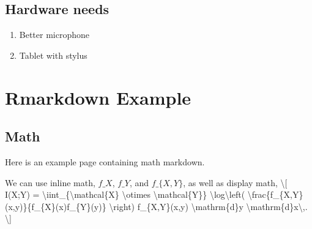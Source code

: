 \documentclass[
]{book}
\newenvironment{Shaded}{\begin{snugshade}}{\end{snugshade}}
\newcommand{\NormalTok}[1]{#1}
\newcommand{\SpecialCharTok}[1]{\textcolor[rgb]{0.00,0.00,0.00}{#1}}
\newcommand{\SpecialStringTok}[1]{\textcolor[rgb]{0.31,0.60,0.02}{#1}}
\providecommand{\tightlist}{%
  \setlength{\itemsep}{0pt}\setlength{\parskip}{0pt}}
\begin{document}
\hypertarget{hardware-needs}{%
\section*{Hardware needs}\label{hardware-needs}}

\begin{enumerate}
\def\labelenumi{\arabic{enumi}.}
\tightlist
\item
  Better microphone
\item
  Tablet with stylus
\end{enumerate}

\hypertarget{rmarkdown-example}{%
\chapter*{Rmarkdown Example}\label{rmarkdown-example}}

\hypertarget{math}{%
\section*{Math}\label{math}}

Here is an example page containing math markdown.

\begin{Shaded}
\begin{Highlighting}[]
\NormalTok{We can use inline math, }\SpecialStringTok{$f\_X$}\NormalTok{, }\SpecialStringTok{$f\_Y$}\NormalTok{, and }\SpecialStringTok{$f\_\{X,Y\}$}\NormalTok{, as well as display math, }
\SpecialStringTok{\textbackslash{}[}
\SpecialStringTok{  I(X;Y)}
\SpecialStringTok{  = }\SpecialCharTok{\textbackslash{}iint}\SpecialStringTok{\_\{}\SpecialCharTok{\textbackslash{}mathcal}\SpecialStringTok{\{X\} }\SpecialCharTok{\textbackslash{}otimes}\SpecialStringTok{ }\SpecialCharTok{\textbackslash{}mathcal}\SpecialStringTok{\{Y\}\}}
\SpecialStringTok{  }\SpecialCharTok{\textbackslash{}log\textbackslash{}left}\SpecialStringTok{( }\SpecialCharTok{\textbackslash{}frac}\SpecialStringTok{\{f\_\{X,Y\}(x,y)\}\{f\_\{X\}(x)f\_\{Y\}(y)\} }\SpecialCharTok{\textbackslash{}right}\SpecialStringTok{)}
\SpecialStringTok{  f\_\{X,Y\}(x,y) }\SpecialCharTok{\textbackslash{}mathrm}\SpecialStringTok{\{d\}y }\SpecialCharTok{\textbackslash{}mathrm}\SpecialStringTok{\{d\}x}\SpecialCharTok{\textbackslash{},}\SpecialStringTok{.}
\SpecialStringTok{\textbackslash{}]}
\end{Highlighting}
\end{Shaded}
\end{document}
